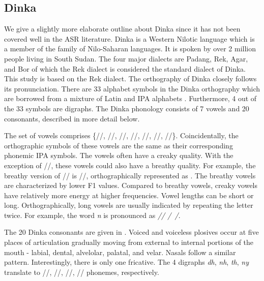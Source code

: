 \documentclass[a4paper]{article}
\begin{document}
\subsection{Dinka} \vspace{-1mm}
We give a slightly more elaborate outline about Dinka since it has not been covered well in the ASR literature. Dinka is a Western Nilotic language which is a member of the family of Nilo-Saharan languages. It is spoken by over 2 million people living in South Sudan. The four major dialects are Padang, Rek, Agar, and Bor of which the Rek dialect is considered the standard dialect of Dinka. This study is based on the Rek dialect. The orthography of Dinka closely follows its pronunciation. There are 33 alphabet symbols in the Dinka orthography which are borrowed from a mixture of Latin and IPA alphabets \cite{DinkaOmniglot}. Furthermore, 4 out of the 33 symbols are digraphs. The Dinka phonology \cite{Remijsen-LuanyjangDinka} consists of 7 vowels and 20 consonants, described in more detail below.

The set of vowels comprises \{//, //, //, //, //, //, //\}. Coincidentally, the orthographic symbols of these vowels are the same as their corresponding phonemic IPA symbols. The vowels often have a creaky quality. With the exception of //, these vowels could also have a breathy quality. For example, the breathy version of // is //, orthographically represented as . The breathy vowels are characterized by lower F1 values. Compared to breathy vowels, creaky vowels have relatively more energy at higher frequencies. Vowel lengths can be short or long. Orthographically, long vowels are usually indicated by repeating the letter twice. For example, the word \emph{n} is pronounced as \emph{// /~/}.

The 20 Dinka consonants are given in \cite{DinkaWiki}. Voiced and voiceless plosives occur at five places of articulation gradually moving from external to internal portions of the mouth - labial, dental, alvelolar, palatal, and velar. Nasals follow a similar pattern. Interestingly, there is only one fricative. The 4 digraphs \emph{dh}, \emph{nh}, \emph{th}, \emph{ny} translate to /\textipa{\|[d}/, /\textipa{\|[n}/, /\textipa{\|[t}/, /\textltailn/ phonemes, respectively.
\end{document}

